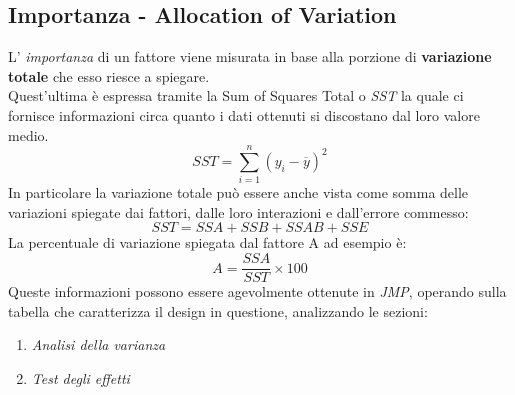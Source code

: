 \subsection{Importanza - Allocation of Variation}
L' \textit{importanza} di un fattore viene misurata in base alla porzione di \textbf{variazione totale} che esso riesce a spiegare.
\\Quest'ultima è espressa tramite la Sum of Squares Total o \textit{SST} la quale ci fornisce informazioni circa quanto i dati ottenuti si discostano dal loro valore medio.
\begin{equation*}
	SST = \sum_{i = 1}^{n}{({y_i} - \overline{y})^2}
\end{equation*}
In particolare la variazione totale può essere anche vista come somma delle variazioni spiegate dai fattori, dalle loro interazioni e dall'errore commesso:
\begin{equation*}
	SST = SSA + SSB + SSAB + SSE
\end{equation*}
La percentuale di variazione spiegata dal fattore A ad esempio è: 
\begin{equation*}
	A = \dfrac{SSA}{SST} \times 100
\end{equation*}
Queste informazioni possono essere agevolmente ottenute in \textit{JMP}, operando sulla tabella che caratterizza il design in questione, analizzando le sezioni:
\begin{enumerate}
	\item \textit{Analisi della varianza}
	\item \textit{Test degli effetti}
\end{enumerate}

